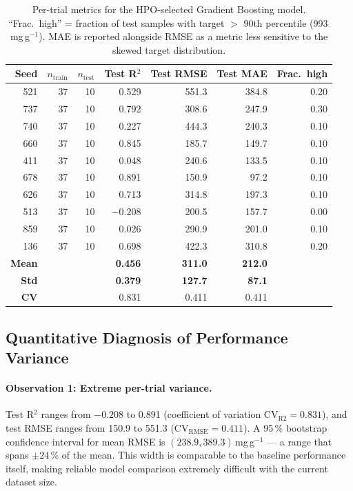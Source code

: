 \documentclass[12pt,a4paper]{article}
\begin{document}
\begin{table}[h]
\centering
\caption{Per-trial metrics for the HPO-selected Gradient Boosting model.
  ``Frac.\ high'' = fraction of test samples with target $>$ 90th
  percentile (993\,mg\,g$^{-1}$).  MAE is reported alongside RMSE
  as a metric less sensitive to the skewed target distribution.}
\label{tab:per_trial}
\small
\begin{tabular}{rrrrrrr}
\toprule
Seed & $n_\text{train}$ & $n_\text{test}$ & Test R$^2$ & Test RMSE & Test MAE & Frac.\ high \\
\midrule
521  & 37 & 10 & 0.529 & 551.3 & 384.8 & 0.20 \\
737  & 37 & 10 & 0.792 & 308.6 & 247.9 & 0.30 \\
740  & 37 & 10 & 0.227 & 444.3 & 240.3 & 0.10 \\
660  & 37 & 10 & 0.845 & 185.7 & 149.7 & 0.10 \\
411  & 37 & 10 & 0.048 & 240.6 & 133.5 & 0.10 \\
678  & 37 & 10 & 0.891 & 150.9 &  97.2 & 0.10 \\
626  & 37 & 10 & 0.713 & 314.8 & 197.3 & 0.10 \\
513  & 37 & 10 & $-0.208$ & 200.5 & 157.7 & 0.00 \\
859  & 37 & 10 & 0.026 & 290.9 & 201.0 & 0.10 \\
136  & 37 & 10 & 0.698 & 422.3 & 310.8 & 0.20 \\
\midrule
\textbf{Mean} & & & \textbf{0.456} & \textbf{311.0} & \textbf{212.0} & \\
\textbf{Std}  & & & \textbf{0.379} & \textbf{127.7} & \textbf{87.1}  & \\
\textbf{CV}   & & & 0.831         & 0.411          & 0.411           & \\
\bottomrule
\end{tabular}
\end{table}

\subsection{Quantitative Diagnosis of Performance Variance}

\paragraph{Observation 1: Extreme per-trial variance.}
Test R$^2$ ranges from $-0.208$ to 0.891 (coefficient of variation
CV$_\text{R2} = 0.831$), and test RMSE ranges from 150.9 to 551.3
(CV$_\text{RMSE} = 0.411$).  A 95\,\% bootstrap confidence interval for
mean RMSE is $(238.9, 389.3)$\,mg\,g$^{-1}$ — a range that spans
$\pm 24$\,\% of the mean.  This width is comparable to the baseline
performance itself, making reliable model comparison extremely difficult
with the current dataset size.
\end{document}
